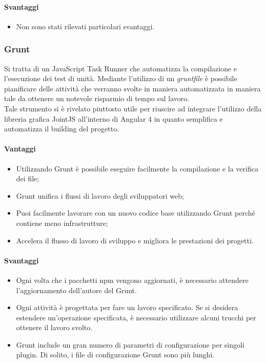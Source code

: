 \paragraph{Svantaggi}
\begin{itemize}
\item Non sono stati rilevati particolari svantaggi.
\end{itemize}

\subsubsection{Grunt}
Si tratta di un JavaScript Task Runner che automatizza la compilazione e l'esecuzione dei test di unità.
Mediante l'utilizzo di un \emph{gruntfile} è possibile pianificare delle attività che verranno svolte in maniera automatizzata in maniera tale da ottenere un notevole risparmio
di tempo sul lavoro.\\
Tale strumento si è rivelato piuttosto utile per riuscire ad integrare l'utilizzo della libreria grafica JointJS all'interno di Angular 4 in quanto semplifica e automatizza il building
del progetto.
\paragraph{Vantaggi}
\begin{itemize}
\item Utilizzando Grunt è possibile eseguire facilmente la compilazione e la verifica dei file;
\item Grunt unifica i flussi di lavoro degli sviluppatori web;
\item Puoi facilmente lavorare con un nuovo codice base utilizzando Grunt perché contiene meno infrastrutture;
\item Accelera il flusso di lavoro di sviluppo e migliora le prestazioni dei progetti.
\end{itemize}

\paragraph{Svantaggi}
\begin{itemize}
\item Ogni volta che i pacchetti npm vengono aggiornati, è necessario attendere l'aggiornamento dell'autore del Grunt.

\item Ogni attività è progettata per fare un lavoro specificato. Se si desidera estendere un'operazione specificata, è necessario utilizzare alcuni trucchi per ottenere il lavoro svolto.

\item Grunt include un gran numero di parametri di configurazione per singoli plugin. Di solito, i file di configurazione Grunt sono più lunghi.

\end{itemize}


